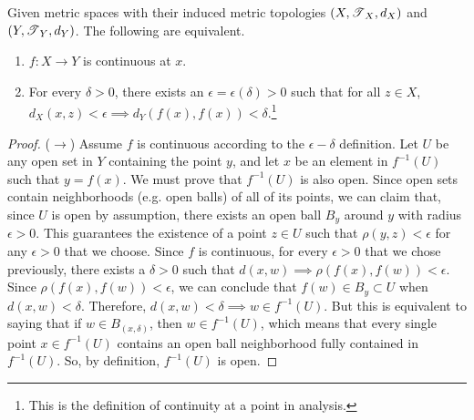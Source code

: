   \begin{theorem}[Analytic Continuity = Topological Continuity] 
    Given metric spaces with their induced metric topologies $(X, \operatorname{\mathscr{T}}_X, d_X)$ and $(Y, \operatorname{\mathscr{T}}_Y, d_Y)$. The following are equivalent. 
    \begin{enumerate}
      \item $f: X \rightarrow Y$ is continuous at $x$. 
      \item For every $\delta > 0$, there exists an $\epsilon = \epsilon(\delta) > 0$ such that for all $z \in X$, $d_X (x, z) < \epsilon \implies d_Y (f(x), f(x)) < \delta$.\footnote{This is the definition of continuity at a point in analysis.} 
    \end{enumerate}
  \end{theorem}
  \begin{proof}
    ($\rightarrow$) Assume $f$ is continuous according to the $\epsilon - \delta$ definition. Let $U$ be any open set in $Y$ containing the point $y$, and let $x$ be an element in $f^{-1}(U)$ such that $y = f(x)$. We must prove that $f^{-1}(U)$ is also open. Since open sets contain neighborhoods (e.g. open balls) of all of its points, we can claim that, since $U$ is open by assumption, there exists an open ball $B_y$ around $y$ with radius $\epsilon > 0$. This guarantees the existence of a point $z \in U$ such that $\rho(y, z) < \epsilon$ for any $\epsilon > 0$ that we choose. Since $f$ is continuous, for every $\epsilon >0$ that we chose previously, there exists a $\delta >0$ such that $d(x, w) \implies \rho(f(x), f(w)) < \epsilon$. Since $\rho(f(x), f(w)) < \epsilon$, we can conclude that $f(w) \in B_y \subset U$ when $d(x, w) < \delta$. Therefore, $d(x, w) < \delta \implies w \in f^{-1}(U)$. But this is equivalent to saying that if $w \in B_(x, \delta)$, then $w \in f^{-1}(U)$, which means that every single point $x \in f^{-1}(U)$ contains an open ball neighborhood fully contained in $f^{-1}(U)$. So, by definition, $f^{-1}(U)$ is open. 



\end{proof}
